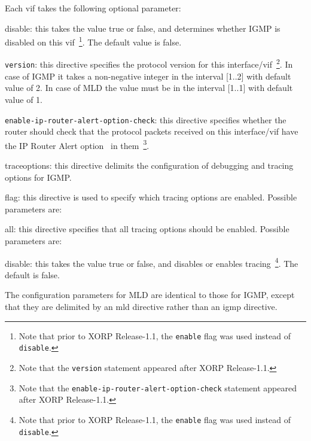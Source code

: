 \begin{description}
\begin{description}
  Each vif takes the following optional parameter:
\begin{description}
\item{\stt disable}: this takes the value {\stt true} or {\stt false},
  and determines whether IGMP is disabled on this vif~\footnote{Note
  that prior to XORP Release-1.1, the {\tt enable} flag was used instead of
  {\tt disable}.}.
  The default value is {\stt false}.
\item{\tt version}: this directive specifies the protocol version
  for this interface/vif~\footnote{Note that the {\tt version} statement
  appeared after XORP Release-1.1.}. In case of IGMP it takes a 
  non-negative integer in the interval [1..2] with default value of 2.
  In case of MLD the value must be in the interval [1..1] with default
  value of 1.
\item{\tt enable-ip-router-alert-option-check}: this directive specifies
  whether the router should check that the protocol packets received on
  this interface/vif have the IP Router Alert option~\cite{RFC2213} in
  them~\footnote{Note that the {\tt enable-ip-router-alert-option-check}
  statement appeared after XORP Release-1.1.}.
\end{description}
\end{description}
\item{\stt traceoptions}: this directive delimits the configuration of
  debugging and tracing options for IGMP.
\begin{description}
\item{\stt flag}: this directive is used to specify which tracing
  options are enabled.  Possible parameters are:
\begin{description}
\item{\stt all}: this directive specifies that all tracing
  options should be enabled.  Possible parameters are:
\begin{description}
\item{\stt disable}: this takes the value {\stt true} or {\stt false},
  and disables or enables tracing~\footnote{Note
  that prior to XORP Release-1.1, the {\tt enable} flag was used instead of
  {\tt disable}.}. The default is {\stt false}.
\end{description}
\end{description}
\end{description}
\end{description}

The configuration parameters for MLD are identical to those for IGMP,
except that they are delimited by an {\stt mld} directive rather than
an {\stt igmp} directive.

